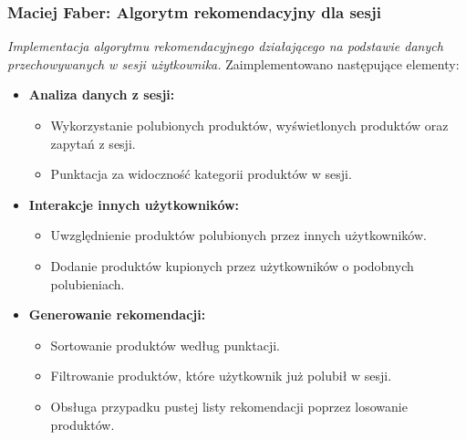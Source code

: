 \documentclass[12pt,a4paper,oneside]{article}
\theoremstyle{definition}
\numberwithin{equation}{section}
\begin{document}
\subsubsection{Maciej Faber: Algorytm rekomendacyjny dla sesji}
\label{section:1.3.53}
\textit{
Implementacja algorytmu rekomendacyjnego działającego na podstawie danych przechowywanych w sesji użytkownika.
}
Zaimplementowano następujące elementy:
\begin{itemize}
    \item \textbf{Analiza danych z sesji:}
    \begin{itemize}
        \item Wykorzystanie polubionych produktów, wyświetlonych produktów oraz zapytań z sesji.
        \item Punktacja za widoczność kategorii produktów w sesji.
    \end{itemize}
    \item \textbf{Interakcje innych użytkowników:}
    \begin{itemize}
        \item Uwzględnienie produktów polubionych przez innych użytkowników.
        \item Dodanie produktów kupionych przez użytkowników o podobnych polubieniach.
    \end{itemize}
    \item \textbf{Generowanie rekomendacji:}
    \begin{itemize}
        \item Sortowanie produktów według punktacji.
        \item Filtrowanie produktów, które użytkownik już polubił w sesji.
        \item Obsługa przypadku pustej listy rekomendacji poprzez losowanie produktów.
    \end{itemize}
\end{itemize}
\end{document}
